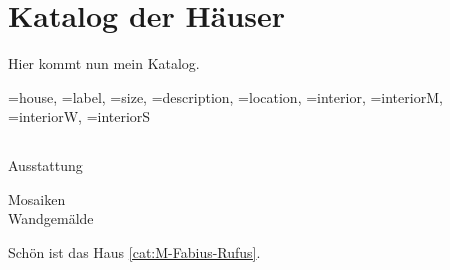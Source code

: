 
\chapter{Katalog der Häuser}

Hier kommt nun mein Katalog.
\renewcommand\thesection{Kat.\arabic{section}}

%
{\house=house,%
\mylabel=label,%
\size=size,%
\mydescription=description,%
\location=location,%
\interior=interior,%
\interiorM=interiorM,%
\interiorW=interiorW,%
\interiorS=interiorS}%
{\section{\house}
\label{cat:\mylabel}
\mydescription
\begin{labeling}{Ausstattung}
	\item[Größe] \size\thinspace\square\meter%
	\item[Ort] \location
	\item[Ausstattung]\ifdefempty{\interior}{~}{\interior}%
	\begin{description}
		\item[Mosaiken] \interiorM
		\item[Wandgemälde] \interiorW
		\ifdefempty{\interiorS}{}{
		\item[Skulptur] \interiorS}
	\end{description}
\end{labeling}%
}


Schön ist das Haus \ref{cat:M-Fabius-Rufus}.
